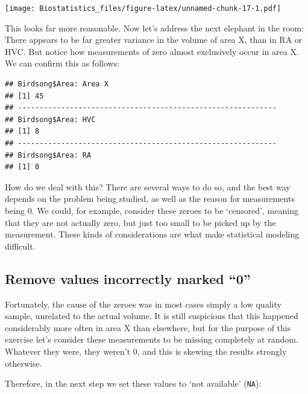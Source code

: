 \documentclass[
]{book}
\newenvironment{Shaded}{\begin{snugshade}}{\end{snugshade}}
\newcommand{\ControlFlowTok}[1]{\textcolor[rgb]{0.13,0.29,0.53}{\textbf{#1}}}
\newcommand{\DecValTok}[1]{\textcolor[rgb]{0.00,0.00,0.81}{#1}}
\newcommand{\KeywordTok}[1]{\textcolor[rgb]{0.13,0.29,0.53}{\textbf{#1}}}
\newcommand{\NormalTok}[1]{#1}
\newcommand{\OperatorTok}[1]{\textcolor[rgb]{0.81,0.36,0.00}{\textbf{#1}}}
\newcommand{\StringTok}[1]{\textcolor[rgb]{0.31,0.60,0.02}{#1}}
\begin{document}
\texttt{[image: Biostatistics\_files/figure-latex/unnamed-chunk-17-1.pdf]}

This looks far more reasonable. Now let's address the next elephant in the room: There appears to be far greater variance in the volume of area X, than in RA or HVC. But notice how measurements of zero almost exclusively occur in area X. We can confirm this as follows:

\begin{Shaded}
\end{Shaded}

\begin{verbatim}
## Birdsong$Area: Area X
## [1] 45
## ------------------------------------------------------------ 
## Birdsong$Area: HVC
## [1] 8
## ------------------------------------------------------------ 
## Birdsong$Area: RA
## [1] 0
\end{verbatim}

How do we deal with this? There are several ways to do so, and the best way depends on the problem being studied, as well as the reason for measurements being \(0\). We could, for example, consider these zeroes to be `censored', meaning that they are not actually zero, but just too small to be picked up by the measurement. These kinds of considerations are what make statistical modeling difficult.

\hypertarget{remove-values-incorrectly-marked-0}{%
\subsection{Remove values incorrectly marked ``0''}\label{remove-values-incorrectly-marked-0}}

Fortunately, the cause of the zeroes was in most cases simply a low quality sample, unrelated to the actual volume. It is still suspicious that this happened considerably more often in area X than elsewhere, but for the purpose of this exercise let's consider these measurements to be missing completely at random. Whatever they were, they weren't \(0\), and this is skewing the results strongly otherwise.

Therefore, in the next step we set these values to `not available' (\texttt{NA}):
\end{document}
